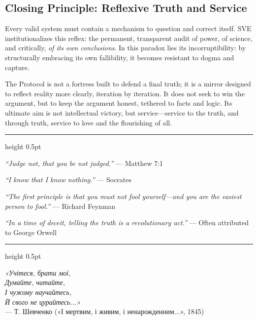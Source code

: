 \documentclass[11pt,a4paper]{article}
\theoremstyle{definition}
\theoremstyle{remark}
\begin{document}
\begin{small}
\vspace{1.5em}

\subsection*{\textcolor{headercolor}{Closing Principle: Reflexive Truth and Service}}

Every valid system must contain a mechanism to question and correct itself. SVE institutionalizes this reflex: the permanent, transparent audit of power, of science, and critically, \textit{of its own conclusions}. In this paradox lies its incorruptibility: by structurally embracing its own fallibility, it becomes resistant to dogma and capture.

The Protocol is not a fortress built to defend a final truth; it is a mirror designed to reflect reality more clearly, iteration by iteration. It does not seek to win the argument, but to keep the argument honest, tethered to facts and logic. Its ultimate aim is not intellectual victory, but service—service to the truth, and through truth, service to love and the flourishing of all.

\vspace{2em}

\begin{center}
\begin{minipage}{0.9\textwidth}
\hrule height 0.5pt
\vspace{1em}

\noindent\textit{``Judge not, that you be not judged.''} --- Matthew 7:1

\vspace{0.6em}
\noindent\textit{``I know that I know nothing.''} --- Socrates

\vspace{0.6em}
\noindent\textit{``The first principle is that you must not fool yourself—and you are the easiest person to fool.''} --- Richard Feynman

\vspace{0.6em}
\noindent\textit{``In a time of deceit, telling the truth is a revolutionary act.''} --- Often attributed to George Orwell

\vspace{1em}
\hrule height 0.5pt
\vspace{1em}

{\selectfont
\noindent\textit{«Учітеся, брати мої,\\
Думайте, читайте,\\
І чужому научайтесь,\\
Й свого не цурайтесь...»}\\
--- Т. Шевченко («І мертвим, і живим, і ненарожденним...», 1845)

}
\end{minipage}
\end{center}
\end{small}
\end{document}
